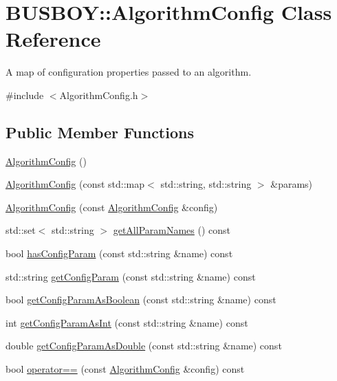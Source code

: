 \hypertarget{classBUSBOY_1_1AlgorithmConfig}{
\section{BUSBOY::AlgorithmConfig Class Reference}
\label{classBUSBOY_1_1AlgorithmConfig}
}


A map of configuration properties passed to an algorithm.  


{\ttfamily \#include $<$AlgorithmConfig.h$>$}\subsection*{Public Member Functions}
\begin{DoxyCompactItemize}
\item 
\hyperlink{classBUSBOY_1_1AlgorithmConfig_ae72567ccc22853d6a99f72b5c0451ea8}{AlgorithmConfig} ()
\item 
\hyperlink{classBUSBOY_1_1AlgorithmConfig_ae18ccf9ed85ff25bd73ca4133ec73817}{AlgorithmConfig} (const std::map$<$ std::string, std::string $>$ \&params)
\item 
\hyperlink{classBUSBOY_1_1AlgorithmConfig_a0af971a3e21bc483762d559a2aa876dc}{AlgorithmConfig} (const \hyperlink{classBUSBOY_1_1AlgorithmConfig}{AlgorithmConfig} \&config)
\item 
std::set$<$ std::string $>$ \hyperlink{classBUSBOY_1_1AlgorithmConfig_aa8052d110b7617fe89058a7426452b74}{getAllParamNames} () const 
\item 
bool \hyperlink{classBUSBOY_1_1AlgorithmConfig_a23879b0eff00f20bd949d4c673afb6ad}{hasConfigParam} (const std::string \&name) const 
\item 
std::string \hyperlink{classBUSBOY_1_1AlgorithmConfig_add1e628d4d2700f3be58a3cf7b4176f6}{getConfigParam} (const std::string \&name) const 
\item 
bool \hyperlink{classBUSBOY_1_1AlgorithmConfig_add5d0b2340d81e70ed249de0c5478d23}{getConfigParamAsBoolean} (const std::string \&name) const 
\item 
int \hyperlink{classBUSBOY_1_1AlgorithmConfig_a2d53008dfc68eb401f4cebf9683d4e51}{getConfigParamAsInt} (const std::string \&name) const 
\item 
double \hyperlink{classBUSBOY_1_1AlgorithmConfig_a1be9c77dd8275d1bb7b16a2f2551ff1d}{getConfigParamAsDouble} (const std::string \&name) const 
\item 
bool \hyperlink{classBUSBOY_1_1AlgorithmConfig_af12aaef7786f1411b3234c6c3cbc5dee}{operator==} (const \hyperlink{classBUSBOY_1_1AlgorithmConfig}{AlgorithmConfig} \&config) const 

\end{DoxyCompactItemize}
